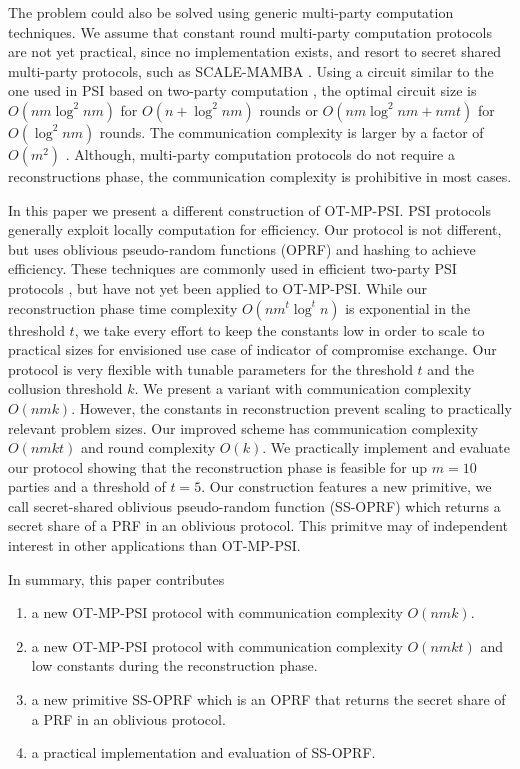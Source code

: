 \documentclass[10pt, sigconf]{acmart}
\begin{document}
The problem could also be solved using generic multi-party computation techniques.
We assume that constant round multi-party computation protocols \cite{} are not yet practical, since no implementation exists, and resort to secret shared multi-party protocols, such as SCALE-MAMBA \cite{}.
Using a circuit similar to the one used in PSI based on two-party computation \cite{}, the optimal circuit size is $O(nm \log^2 nm)$ for $O(n + \log^2 nm)$ rounds or $O(nm \log^2 nm + nmt)$ for $O(\log^2 nm)$ rounds.
The communication complexity is larger by a factor of $O(m^2)$ \cite{}.
Although, multi-party computation protocols do not require a reconstructions phase, the communication complexity is prohibitive in most cases.

In this paper we present a different construction of OT-MP-PSI.
PSI protocols generally exploit locally computation for efficiency.
Our protocol is not different, but uses oblivious pseudo-random functions (OPRF) and hashing to achieve efficiency.
These techniques are commonly used in efficient two-party PSI protocols \cite{}, but have not yet been applied to OT-MP-PSI.
While our reconstruction phase time complexity $O(n m^t \log^t n)$ is exponential in the threshold $t$, we take every effort to keep the constants low in order to scale to practical sizes for envisioned use case of indicator of compromise exchange.
Our protocol is very flexible with tunable parameters for the threshold $t$ and the collusion threshold $k$.
We present a variant with communication complexity $O(nmk)$.
However, the constants in reconstruction prevent scaling to practically relevant problem sizes.
Our improved scheme has communication complexity $O(nmkt)$ and round complexity $O(k)$.
We practically implement and evaluate our protocol showing that the reconstruction phase is feasible for up $m = 10$ parties and a threshold of $t = 5$.
Our construction features a new primitive, we call secret-shared oblivious pseudo-random function (SS-OPRF) which returns a secret share of a PRF in an oblivious protocol.
This primitve may of independent interest in other applications than OT-MP-PSI.

In summary, this paper contributes

\begin{enumerate}

\item a new OT-MP-PSI protocol with communication complexity $O(nmk)$.

\item a new OT-MP-PSI protocol with communication complexity $O(nmkt)$ and low constants during the reconstruction phase.

\item a new primitive SS-OPRF which is an OPRF that returns the secret share of a PRF in an oblivious protocol.

\item a practical implementation and evaluation of SS-OPRF.

\end{enumerate}
\end{document}
